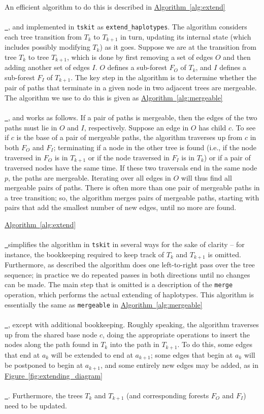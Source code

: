 \documentclass[10pt,twoside,lineno]{gsajnl}
\newcommand{\tskit}{\texttt{tskit}}
\newcommand{\algorithmref}[2][]{%
	\hyperref[{#2}]{%
		Algorithm~\ref*{#2}%
		\ifx\\#1\\%
		\else
		\,#1%
		\fi
	}%
}
\newcommand*{\figref}[2][]{%
	\hyperref[{#2}]{%
		Figure~\ref*{#2}%
		\ifx\\#1\\%
		\else
		\,#1%
		\fi
	}%
}
\begin{document}
An efficient algorithm to do this is described in \algorithmref{alg:extend}, 
and implemented in \tskit{} as \texttt{extend\_haplotypes}.
The algorithm considers each tree transition from $T_k$ to $T_{k+1}$ in turn, updating its internal state
(which includes possibly modifying $T_k$) as it goes.
Suppose we are at the transition from tree $T_k$ to tree $T_{k+1}$,
which is done by first removing a set of edges $O$
and then adding another set of edges $I$.
$O$ defines a sub-forest $F_O$ of $T_k$,
and $I$ defines a sub-forest $F_I$ of $T_{k+1}$.
The key step in the algorithm is to determine whether the pair of paths
that terminate in a given node in two adjacent trees are mergeable.
The algorithm we use to do this is given as \algorithmref{alg:mergeable},
and works as follows.
If a pair of paths is mergeable,
then the edges of the two paths must lie in $O$ and $I$, respectively.
Suppose an edge in $O$ has child $c$.
To see if $c$ is the base of a pair of mergeable paths,
the algorithm traverses up from $c$ in both $F_O$ and $F_I$;
terminating if a node in the other tree is found
(i.e., if the node traversed in $F_O$ is in $T_{k+1}$ or if the node traversed in $F_I$ is in $T_k$)
or if a pair of traversed nodes have the same time.
If these two traversals end in the same node $p$, the paths are mergeable.
Iterating over all edges in $O$ will thus find all mergeable pairs of paths.
There is often more than one pair of mergeable paths in a tree transition;
so, the algorithm merges pairs of mergeable paths,
starting with pairs that add the smallest number of new edges,
until no more are found.


\algorithmref{alg:extend} simplifies the algorithm in \tskit{}
in several ways for the sake of clarity --
for instance, the bookkeeping required to keep track of $T_k$ and $T_{k+1}$ is omitted.
Furthermore, as described the algorithm does one left-to-right pass over the tree sequence;
in practice we do repeated passes in both directions until no changes can be made.
The main step that is omitted is a description of the \texttt{merge} operation,
which performs the actual extending of haplotypes.
This algorithm is essentially the same as \texttt{mergeable} in \algorithmref{alg:mergeable},
except with additional bookkeeping.
Roughly speaking, the algorithm
traverses up from the shared base node $c$,
doing the appropriate operations to insert the nodes along the path found in $T_k$
into the path in $T_{k+1}$.
To do this, some edges that end at $a_k$ will be extended to end at $a_{k+1}$;
some edges that begin at $a_k$ will be postponed to begin at $a_{k+1}$,
and some entirely new edges may be added, as in \figref{fig:extending_diagram}.
Furthermore, the trees $T_k$ and $T_{k+1}$ (and corresponding forests $F_O$ and $F_I$)
need to be updated.
\end{document}
